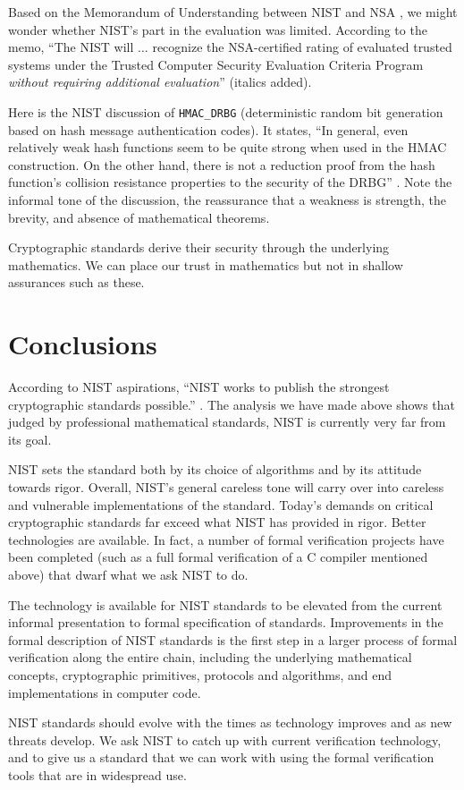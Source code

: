 \documentclass[11pt]{amsart} %
\begin{document}
Based on the Memorandum of Understanding between NIST and NSA \cite[p.601]{ScAC}, we might
wonder whether NIST's part in the evaluation was limited.
According to the memo, ``The NIST will $\ldots$ recognize the NSA-certified rating of evaluated trusted
systems under the Trusted Computer Security Evaluation Criteria Program {\it without requiring additional
evaluation}'' (italics added). 

Here is the NIST discussion of {\tt HMAC\_DRBG}
(deterministic random bit generation based on hash message authentication codes).  It states, ``In general, even
relatively weak hash functions seem to be quite strong when used in the HMAC construction.
On the other hand, there is not a reduction proof from the hash function's collision resistance
properties to the security of the DRBG'' \cite[Appendix E.2]{NIST}. 
Note the informal tone of the discussion, the  reassurance
that a weakness is strength, the brevity, and absence of mathematical theorems.  

Cryptographic standards derive their security through the
underlying mathematics.   We can place our trust in mathematics but not in shallow assurances such as these.

\section{Conclusions}


According to NIST aspirations,
``NIST works to publish the strongest cryptographic standards possible.'' \cite{NIST-Supp}.
The analysis we have made above shows that judged by professional mathematical standards, NIST is currently
very far from its goal.


NIST sets the standard both
by its choice of algorithms and by its attitude towards rigor.
Overall,  NIST's general careless tone will 
carry over into careless and vulnerable implementations of the standard.  
Today's demands on critical cryptographic standards far exceed what NIST has provided in rigor.
Better technologies are available.  In fact,
a number of formal verification projects have been completed (such as a full formal verification of a C compiler
mentioned above) that dwarf what we ask NIST  to do. 

The technology is available for NIST standards to be elevated from the current informal presentation
to formal specification of standards.  Improvements in the formal description of NIST standards is the first
step in a larger process of formal verification along the entire chain, including
the
underlying mathematical concepts, cryptographic primitives, protocols and algorithms, 
and end implementations
in computer code.

NIST standards should evolve with the times as technology improves and as new threats develop.
 We ask NIST to
catch up with current verification technology, and to give us a standard that we can
work with using the formal verification tools that are in widespread use.



\end{document}
